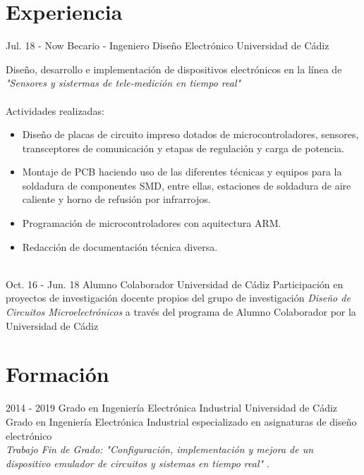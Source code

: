 \documentclass[]{cv-class}
\begin{document}
\section{Experiencia}
\begin{entrylist}
  \entry
    {Jul. 18 - Now}
    {Becario - Ingeniero Diseño Electrónico}
    {Universidad de Cádiz}
    {Diseño, desarrollo e implementación de dispositivos electrónicos en la línea de \emph{"Sensores y sistermas de tele-medición en tiempo real"}\\\\
    Actividades realizadas:\\
    \begin{itemize}
    \item Diseño de placas de circuito impreso dotados de microcontroladores, sensores,
    transceptores de comunicación y etapas de regulación y carga de potencia.
    \item Montaje de PCB haciendo uso de las diferentes técnicas y equipos para la soldadura de componentes SMD, entre ellas, estaciones de soldadura de aire caliente y horno de refusión por infrarrojos.
    \item Programación de microcontroladores con aquitectura ARM.
    \item Redacción de documentación técnica diversa.\\\\
    \end{itemize}
    }
  \entry
    {Oct. 16 - Jun. 18}
    {Alumno Colaborador}
    {Universidad de Cádiz}
    {Participación en proyectos de investigación docente propios del grupo de investigación \emph{Diseño de Circuitos Microelectrónicos} a través del programa de Alumno Colaborador por la Universidad de Cádiz\\
    }
\end{entrylist}

\section{Formación}
\begin{entrylist}
  \entry
    {2014 - 2019}
    {Grado en Ingeniería Electrónica Industrial}
    {Universidad de Cádiz}
    {Grado en Ingeniería Electrónica Industrial especializado en asignaturas de diseño electrónico\\
    \emph{Trabajo Fin de Grado: "Configuración, implementación y mejora de un dispositivo emulador de circuitos y sistemas en tiempo real"
    }.\\}
    
\end{entrylist}
\end{document}
